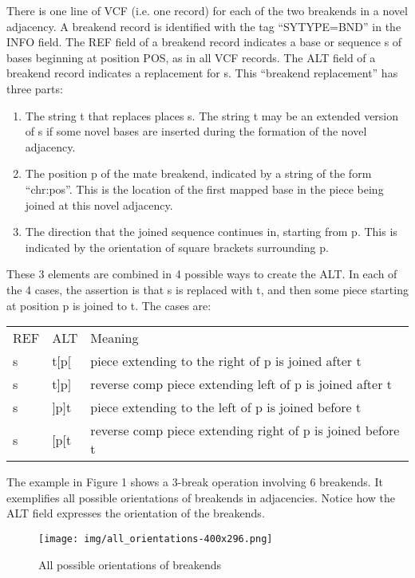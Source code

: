 \documentclass[8pt]{article}
\begin{document}
There is one line of VCF (i.e. one record) for each of the two breakends in a novel adjacency. A breakend record is identified with the tag ``SYTYPE=BND'' in the INFO field. The REF field of a breakend record indicates a base or sequence s of bases beginning at position POS, as in all VCF records. The ALT field of a breakend record indicates a replacement for s. This ``breakend replacement'' has three parts:
\begin{enumerate}
  \item The string t that replaces places s. The string t may be an extended version of s if some novel bases are inserted during the formation of the novel adjacency.
  \item The position p of the mate breakend, indicated by a string of the form ``chr:pos''. This is the location of the first mapped base in the piece being joined at this novel adjacency.
  \item The direction that the joined sequence continues in, starting from p. This is indicated by the orientation of square brackets surrounding p.

\end{enumerate}
These 3 elements are combined in 4 possible ways to create the ALT. In each of the 4 cases, the assertion is that s is replaced with t, and then some piece starting at position p is joined to t. The cases are:

\vspace{0.3cm}
\begin{tabular}{ l l l }
REF & ALT & Meaning \\
s & t$[$p$[$ & piece extending to the right of p is joined after t \\
s & t$]$p$]$ & reverse comp piece extending left of p is joined after t \\
s & $]$p$]$t & piece extending to the left of p is joined before t \\
s & $[$p$[$t & reverse comp piece extending right of p is joined before t \\
\end{tabular}
\vspace{0.3cm}

The example in Figure 1 shows a 3-break operation involving 6 breakends. It exemplifies all possible orientations of breakends in adjacencies. Notice how the ALT field expresses the orientation of the breakends.

\begin{figure}[ht]
\centering
\texttt{[image: img/all\_orientations-400x296.png]}
\caption{All possible orientations of breakends}
\end{figure}
\end{document}
